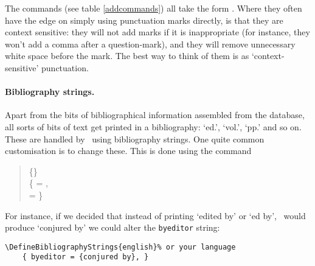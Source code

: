 The commands (see table \ref{addcommands}) all take the form
. Where they often have the edge on simply using
punctuation marks directly, is that they are context sensitive: they
will not add marks if it is inappropriate (for instance, they won't
add a comma after a question-mark), and they will remove unnecessary
white space before the mark. The best way to think of them is as
`context-sensitive' punctuation.

\paragraph{Bibliography strings.} Apart from the bits of
bibliographical information assembled from the database, all sorts
of bits of text get printed in a bibliography: `ed.', `vol.', `pp.'
and so on. These are handled by \biblatex\ using bibliography
strings. One quite common customisation is to change these. This is
done using the command
\begin{quotation}
\ttfamily
{}%
  \{\}\\%
  \quad\{ = ,\\
  \quad {} =  \}
\end{quotation} For
instance, if we decided that instead of printing `edited by' or `ed
by', \biblatex\ would produce `conjured by' we could alter the
\verb|byeditor| string:
\begin{verbatim}
\DefineBibliographyStrings{english}% or your language
    { byeditor = {conjured by}, }
\end{verbatim}

